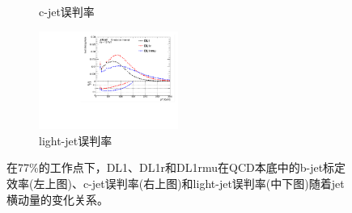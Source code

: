 \begin{figure}[!thbp]
\begin{subfigure}{.5\textwidth}
  \caption{c-jet误判率}
  \end{subfigure}
\newline 
  \begin{subfigure}{.99\textwidth}
  \centering
  \includegraphics[width=0.5\textwidth]{figuresDijet/02-Selection/QCD/Compareltageff_Fix77.pdf}
  \caption{light-jet误判率}
  \end{subfigure}
\caption{
在77\%的工作点下，DL1、DL1r和DL1rmu在QCD本底中的b-jet标定效率(左上图)、c-jet误判率(右上图)和light-jet误判率(中下图)随着jet横动量的变化关系。
}
\label{fig:btagperf_qcd_fix77}
\end{figure}

